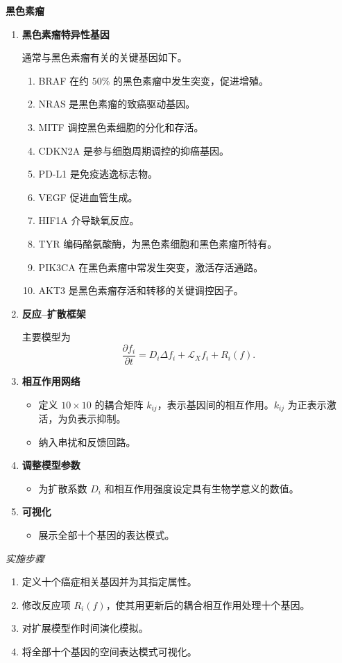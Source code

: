 \textbf{黑色素瘤}
\begin{enumerate}
  \item \textbf{黑色素瘤特异性基因}

  通常与黑色素瘤有关的关键基因如下。
  \begin{enumerate}[label=\arabic*.]
    \item BRAF 在约 $50\%$ 的黑色素瘤中发生突变，促进增殖。
    \item NRAS 是黑色素瘤的致癌驱动基因。
    \item MITF 调控黑色素细胞的分化和存活。
    \item CDKN2A 是参与细胞周期调控的抑癌基因。
    \item PD-L1 是免疫逃逸标志物。
    \item VEGF 促进血管生成。
    \item HIF1A 介导缺氧反应。
    \item TYR 编码酪氨酸酶，为黑色素细胞和黑色素瘤所特有。
    \item PIK3CA 在黑色素瘤中常发生突变，激活存活通路。
    \item AKT3 是黑色素瘤存活和转移的关键调控因子。
  \end{enumerate}
  \item \textbf{反应–扩散框架}

  主要模型为
  \[
    \frac{\partial f_i}{\partial t}=D_i\Delta f_i+\mathcal L_X f_i+R_i(f).
  \]
  \item \textbf{相互作用网络}
  \begin{itemize}
    \item 定义 $10\times10$ 的耦合矩阵 $k_{ij}$，表示基因间的相互作用。$k_{ij}$ 为正表示激活，为负表示抑制。
    \item 纳入串扰和反馈回路。
  \end{itemize}
  \item \textbf{调整模型参数}
  \begin{itemize}
    \item 为扩散系数 $D_i$ 和相互作用强度设定具有生物学意义的数值。
  \end{itemize}
  \item \textbf{可视化}
  \begin{itemize}
    \item 展示全部十个基因的表达模式。
  \end{itemize}
\end{enumerate}

\emph{实施步骤}
\begin{enumerate}
  \item 定义十个癌症相关基因并为其指定属性。
  \item 修改反应项 $R_i(f)$，使其用更新后的耦合相互作用处理十个基因。
  \item 对扩展模型作时间演化模拟。
  \item 将全部十个基因的空间表达模式可视化。
\end{enumerate}

